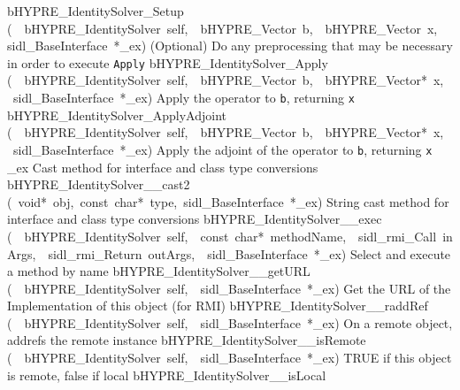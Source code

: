 \documentclass{article}
\begin{document}
\begin{cxxentry}
\begin{cxxentry}
\begin{cxxnames}
        {}
\label{cxx.5.9.25}
        {bHYPRE\_IdentitySolver\_Setup}
        {(\ \ bHYPRE\_IdentitySolver\ self,\ \ bHYPRE\_Vector\ b,\ \ bHYPRE\_Vector\ x,\ \ sidl\_BaseInterface\ *\_ex)}
        {
(Optional) Do any preprocessing that may be necessary in
order to execute {\tt Apply}}
        {}
\label{cxx.5.9.26}
        {bHYPRE\_IdentitySolver\_Apply}
        {(\ \ bHYPRE\_IdentitySolver\ self,\ \ bHYPRE\_Vector\ b,\ \ bHYPRE\_Vector*\ x,\ \ sidl\_BaseInterface\ *\_ex)}
        {
Apply the operator to {\tt b}, returning {\tt x}}
        {}
\label{cxx.5.9.27}
        {bHYPRE\_IdentitySolver\_ApplyAdjoint}
        {(\ \ bHYPRE\_IdentitySolver\ self,\ \ bHYPRE\_Vector\ b,\ \ bHYPRE\_Vector*\ x,\ \ sidl\_BaseInterface\ *\_ex)}
        {
Apply the adjoint of the operator to {\tt b}, returning {\tt x}}
        {}
\label{cxx.5.9.28}
        {\_ex}
        {}
        {
Cast method for interface and class type conversions}
        {}
\label{cxx.5.9.29}
        {bHYPRE\_IdentitySolver\_\_cast2}
        {(\ void*\ obj,\ const\ char*\ type,\ sidl\_BaseInterface\ *\_ex)}
        {
String cast method for interface and class type conversions}
        {}
\label{cxx.5.9.30}
        {bHYPRE\_IdentitySolver\_\_exec}
        {(\ \ bHYPRE\_IdentitySolver\ self,\ \ const\ char*\ methodName,\ \ sidl\_rmi\_Call\ inArgs,\ \ sidl\_rmi\_Return\ outArgs,\ \ sidl\_BaseInterface\ *\_ex)}
        {
Select and execute a method by name}
        {}
\label{cxx.5.9.31}
        {bHYPRE\_IdentitySolver\_\_getURL}
        {(\ \ bHYPRE\_IdentitySolver\ self,\ \ sidl\_BaseInterface\ *\_ex)}
        {
Get the URL of the Implementation of this object (for RMI)}
        {}
\label{cxx.5.9.32}
        {bHYPRE\_IdentitySolver\_\_raddRef}
        {(\ \ bHYPRE\_IdentitySolver\ self,\ \ sidl\_BaseInterface\ *\_ex)}
        {
On a remote object, addrefs the remote instance}
        {}
\label{cxx.5.9.33}
        {bHYPRE\_IdentitySolver\_\_isRemote}
        {(\ \ bHYPRE\_IdentitySolver\ self,\ \ sidl\_BaseInterface\ *\_ex)}
        {
TRUE if this object is remote, false if local}
        {}
\label{cxx.5.9.34}
        {bHYPRE\_IdentitySolver\_\_isLocal}

\end{cxxnames}
\end{cxxentry}
\end{cxxentry}
\end{document}
